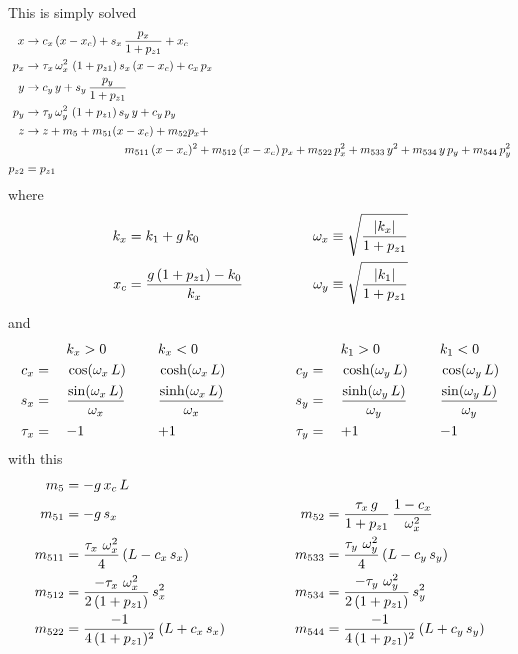 \documentclass{book}
\begin{document}
This is simply solved
\begin{align}
  x   &\rightarrow c_x \, (x - x_c) + s_x \, \frac{p_x}{1 + p_{z1}} + x_c \CRNO
  p_x &\rightarrow \tau_x \, \om_x^2 \, \, (1 + p_{z1}) \, s_x \, (x -x_c) + c_x \, p_x \CRNO
  y   &\rightarrow c_y \, y + s_y \, \frac{p_y}{1 + p_{z1}} \CRNO
  p_y &\rightarrow \tau_y \, \om_y^2 \, \, (1 + p_{z1}) \, s_y \, y + c_y \, p_y \CRNO
  z   &\rightarrow z + m_5 + m_{51} (x - x_c) + m_{52} p_x + \CRNO
      &\hspace*{20ex} m_{511} \, (x-x_c)^2 + m_{512} \, (x-x_c) \, p_x + m_{522} \, p_x^2 + 
                   m_{533} \, y^2 + m_{534} \, y \, p_y + m_{544} \, p_y^2 \CRNO
  p_{z2} &= p_{z1} \nonumber
\end{align}
where 
\begin{alignat}{2}
  k_x &= k_1 + g \, k_0 & \qquad \qquad
  \omega_x &\equiv \sqrt{\frac{|k_x|}{1 + p_{z1}}} \nonumber \\
  x_c &= \frac{g \, (1 + p_{z1}) - k_0}{k_x} & \qquad \qquad
  \omega_y &\equiv \sqrt{\frac{|k_1|}{1 + p_{z1}}} \nonumber \\
\end{alignat}
and
\begin{alignat}{6}
         &\hspace*{3ex}  && k_x > 0          &\hspace*{3ex}& k_x < 0 & \qquad \qquad
         &\hspace*{3ex}  && k_1 > 0          &\hspace*{3ex}& k_1 < 0 \nonumber \\
     c_x &=   && \cos  (\omega_x \, L)               && \cosh (\omega_x \, L) & \qquad \qquad
     c_y &=   && \cosh (\omega_y \, L)               && \cos  (\omega_y \, L) \\
     s_x &=   && \frac{\sin  (\omega_x \, L)}{\omega_x} && \frac{\sinh (\omega_x \, L)}{\omega_x} & \qquad \qquad
     s_y &=   && \frac{\sinh (\omega_y \, L)}{\omega_y} && \frac{\sin  (\omega_y \, L)}{\omega_y} \nonumber \\
  \tau_x &=   && {-}1             && {+}1             & \qquad \qquad
  \tau_y &=   && {+}1             && {-}1             \nonumber
\end{alignat}
with this
\begin{alignat}{2}
  m_5     &= -g \, x_c \, L & \qquad \qquad & \nonumber \\
  m_{51}  &= -g \, s_x & \qquad \qquad
  m_{52}  &= \frac{\tau_x \, g}{1 + p_{z1}} \, \frac{1 - c_x}{\omega_x^2} \nonumber \\
  m_{511} &= \frac{\tau_x \,\, \omega_x^2}{4} \, (L - c_x \, s_x) & \qquad \qquad
  m_{533} &= \frac{\tau_y \,\, \omega_y^2}{4} \, (L - c_y \, s_y) \nonumber \\
  m_{512} &= \frac{-\tau_x \,\, \omega_x^2}{2 \, (1 + p_{z1})} \, s_x^2 & \qquad \qquad
  m_{534} &= \frac{-\tau_y \,\, \omega_y^2}{2 \, (1 + p_{z1})} \, s_y^2 \nonumber \\
  m_{522} &= \frac{-1}{4 \, (1 + p_{z1})^2} \, (L + c_x \, s_x) & \qquad \qquad
  m_{544} &= \frac{-1}{4 \, (1 + p_{z1})^2} \, (L + c_y \, s_y) \nonumber
\end{alignat}
\end{document}
